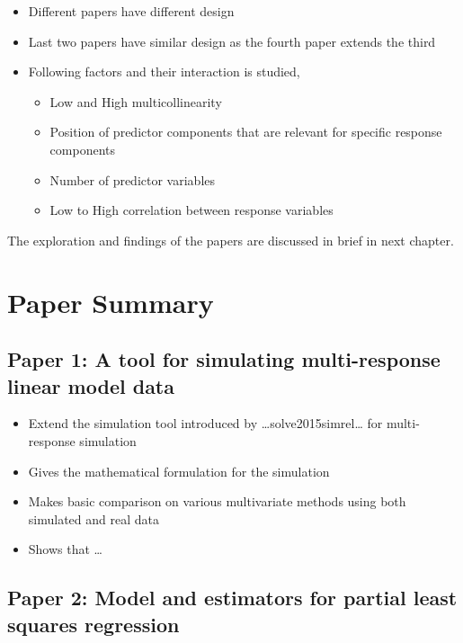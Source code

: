 \documentclass[11pt,twoside,openright,titlepage,
  headinclude,footinclude,BCOR=5mm,
  numbers=noenddot,cleardoublepage=empty,
  tablecaptionabove, dottedtoc,
  bibliography=totoc]{scrreprt}
\providecommand{\tightlist}{%
  \setlength{\itemsep}{0pt}\setlength{\parskip}{0pt}}
\begin{document}
\begin{itemize}
\tightlist
\item
  Different papers have different design
\item
  Last two papers have similar design as the fourth paper extends the third
\item
  Following factors and their interaction is studied,

  \begin{itemize}
  \tightlist
  \item
    Low and High multicollinearity
  \item
    Position of predictor components that are relevant for specific response components
  \item
    Number of predictor variables
  \item
    Low to High correlation between response variables
  \end{itemize}
\end{itemize}

The exploration and findings of the papers are discussed in brief in next chapter.

\hypertarget{paper-summary}{%
\chapter{Paper Summary}\label{paper-summary}}

\hypertarget{paper-1-a-tool-for-simulating-multi-response-linear-model-data}{%
\section{Paper 1: A tool for simulating multi-response linear model data}\label{paper-1-a-tool-for-simulating-multi-response-linear-model-data}}

\begin{itemize}
\tightlist
\item
  Extend the simulation tool introduced by \ldots solve2015simrel\ldots{} for multi-response simulation
\item
  Gives the mathematical formulation for the simulation
\item
  Makes basic comparison on various multivariate methods using both simulated and real data
\item
  Shows that \ldots{}
\end{itemize}

\hypertarget{paper-2-model-and-estimators-for-partial-least-squares-regression}{%
\section{Paper 2: Model and estimators for partial least squares regression}\label{paper-2-model-and-estimators-for-partial-least-squares-regression}}
\end{document}
